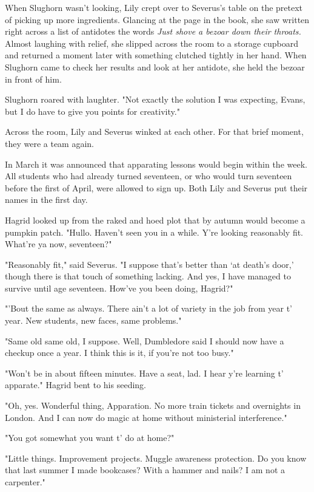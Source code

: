 When Slughorn wasn't looking, Lily crept over to Severus's table on the pretext of picking up more ingredients. Glancing at the page in the book, she saw written right across a list of antidotes the words \emph{Just shove a bezoar down their throats.} Almost laughing with relief, she slipped across the room to a storage cupboard and returned a moment later with something clutched tightly in her hand. When Slughorn came to check her results and look at her antidote, she held the bezoar in front of him.

Slughorn roared with laughter. "Not exactly the solution I was expecting, Evans, but I do have to give you points for creativity."

Across the room, Lily and Severus winked at each other. For that brief moment, they were a team again.

In March it was announced that apparating lessons would begin within the week. All students who had already turned seventeen, or who would turn seventeen before the first of April, were allowed to sign up. Both Lily and Severus put their names in the first day.

Hagrid looked up from the raked and hoed plot that by autumn would become a pumpkin patch. "Hullo. Haven't seen you in a while. Y're looking reasonably fit. What're ya now, seventeen?"

"Reasonably fit," said Severus. "I suppose that's better than `at death's door,' though there is that touch of something lacking. And yes, I have managed to survive until age seventeen. How've you been doing, Hagrid?"

"'Bout the same as always. There ain't a lot of variety in the job from year t' year. New students, new faces, same problems."

"Same old same old, I suppose. Well, Dumbledore said I should now have a checkup once a year. I think this is it, if you're not too busy."

"Won't be in about fifteen minutes. Have a seat, lad. I hear y're learning t' apparate." Hagrid bent to his seeding.

"Oh, yes. Wonderful thing, Apparation. No more train tickets and overnights in London. And I can now do magic at home without ministerial interference."

"You got somewhat you want t' do at home?"

"Little things. Improvement projects. Muggle awareness protection. Do you know that last summer I made bookcases? With a hammer and nails? I am not a carpenter."

